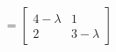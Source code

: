 \documentclass{article}
\begin{document}
\begin{align*}
= \begin{bmatrix} 4-\lambda & 1 \\ 2 & 3-\lambda \end{bmatrix}
\end{align*}
\end{document}
